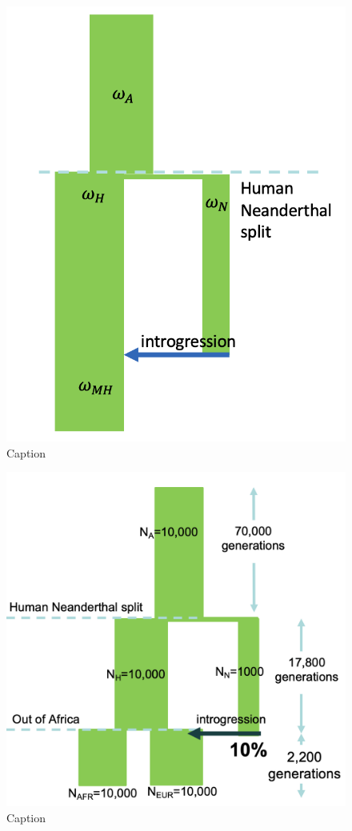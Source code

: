 \begin{figure}[htb]
    \centering
    \includegraphics[width=\textwidth]{chapter5/figures/fig5.2.png}
    \caption{Caption}
    \label{fig:5.2}
\end{figure}

\begin{figure}[htb]
    \centering
    \includegraphics[width=\textwidth]{chapter5/figures/fig5.3.png}
    \caption{Caption}
    \label{fig:5.3}
\end{figure}


